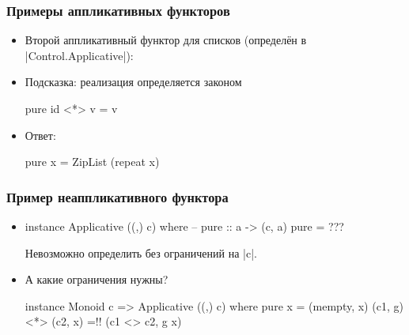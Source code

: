 \documentclass[11pt]{beamer}
\begin{document}
\begin{frame}[fragile]
  \frametitle{Примеры аппликативных функторов}
  \begin{itemize}
    \item Второй аппликативный функтор для списков (определён в \haskinline|Control.Applicative|):
          \pause
    \item Подсказка: реализация определяется законом
          \begin{haskell}
            pure id <*> v = v
          \end{haskell}
          \pause
    \item Ответ:
          \begin{haskell}
            pure x = ZipList (repeat x)
          \end{haskell}
  \end{itemize}
\end{frame}

\begin{frame}[fragile]
  \frametitle{Пример неаппликативного функтора}
  \begin{itemize}
    \item
          \begin{haskell}
            instance Applicative ((,) c) where 
              -- pure :: a -> (c, a)
              pure = ???
          \end{haskell}
          \pause Невозможно определить без ограничений на \haskinline|c|.
          \pause
    \item А какие ограничения нужны? \pause
          \begin{haskell}
            instance Monoid c => Applicative ((,) c) where
              pure x = (mempty, x)
              (c1, g) <*> (c2, x) =!\pause! (c1 <> c2, g x)
          \end{haskell}
  \end{itemize}
\end{frame}
\end{document}
